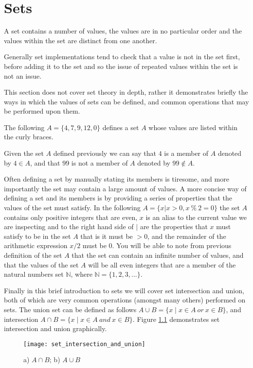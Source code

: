 \chapter{Sets}
A set contains a number of values, the values are in no particular order and the values within the set are distinct from one another.

Generally set implementations tend to check that a value is not in the set first, before adding it to the set and so the issue of repeated values within the set is not an issue.

This section does not cover set theory in depth, rather it demonstrates briefly the ways in which the values of sets can be defined, and common operations that may be performed upon them.

The following $A = \{4, 7, 9, 12, 0\}$ defines a set $A$ whose values are listed within the curly braces. 

Given the set $A$ defined previously we can say that $4$ is a member of $A$ denoted by $4 \in A$, and that $99$ is not a member of $A$ denoted by $99 \notin A$.

Often defining a set by manually stating its members is tiresome, and more importantly the set may contain a large amount of values. A more concise way of defining a set and its members is by providing a series of properties that the values of the set must satisfy. In the following $A = \{x|x > 0, x~\%~2 = 0\}$ the set $A$ contains only positive integers that are even, $x$ is an alias to the current value we are inspecting and to the right hand side of $\mid$ are the properties that $x$ must satisfy to be in the set $A$ that is it must be $> 0$, and the remainder of the arithmetic expression $x / 2$ must be $0$.
You will be able to note from previous definition of the set $A$ that the set can contain an infinite number of values, and that the values of the set $A$ will be all even integers that are a member of the natural numbers set $\mathbb{N}$, where $\mathbb{N} = \{1, 2, 3, ...\}$.

Finally in this brief introduction to sets we will cover set intersection and union, both of which are very common operations (amongst many others) performed on sets. The union set can be defined as follows $A \cup B = \{x \mid x \in A~or~x \in B\}$, and intersection $A \cap B = \{x \mid x \in A~and~x \in B\}$. Figure \ref{fig:set_intersection_and_union} demonstrates set intersection and union graphically.

\begin{figure}
\begin{center}
\texttt{[image: set\_intersection\_and\_union]}
\end{center}
\caption{a) $A \cap B$; b) $A \cup B$} \label{fig:set_intersection_and_union}
\end{figure} 

